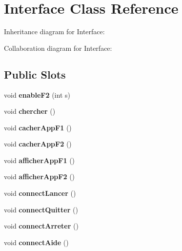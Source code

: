 \hypertarget{class_interface}{}\section{Interface Class Reference}
\label{class_interface}


Inheritance diagram for Interface\+:


Collaboration diagram for Interface\+:
\subsection*{Public Slots}
\begin{DoxyCompactItemize}
\item 
\mbox{\label{class_interface_ae3fb6f273993f8207b2418b68936d873}} 
void {\bfseries enable\+F2} (int s)
\item 
\mbox{\label{class_interface_a3b03a85d7a8dce0bffef8d793c0f2195}} 
void {\bfseries chercher} ()
\item 
\mbox{\label{class_interface_a80a1e37847e43306b94bf53496669e3b}} 
void {\bfseries cacher\+App\+F1} ()
\item 
\mbox{\label{class_interface_ae35b4de3ed5d1433ca4950891fd48fab}} 
void {\bfseries cacher\+App\+F2} ()
\item 
\mbox{\label{class_interface_a5f0bd803004e90b825dd4b22ccf66890}} 
void {\bfseries afficher\+App\+F1} ()
\item 
\mbox{\label{class_interface_ad52e9863e8e9f3e496780f67d18f07a7}} 
void {\bfseries afficher\+App\+F2} ()
\item 
\mbox{\label{class_interface_a0e2f245c0c3c924503a70bd9325e746d}} 
void {\bfseries connect\+Lancer} ()
\item 
\mbox{\label{class_interface_a303469419b33103af1a14589ad02f2ef}} 
void {\bfseries connect\+Quitter} ()
\item 
\mbox{\label{class_interface_adeffb11a443b9996cdf5fd20fdab2aa7}} 
void {\bfseries connect\+Arreter} ()
\item 
\mbox{\label{class_interface_a9633135a56d6c960b17702c9021dfc6c}} 
void {\bfseries connect\+Aide} ()
\end{DoxyCompactItemize}
